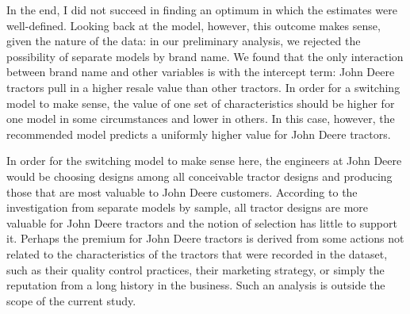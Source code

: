 \documentclass[11pt]{paper}
\begin{document}
In the end, I did not succeed in finding an optimum in which the estimates were well-defined. 
Looking back at the model, however, this outcome makes sense, 
given the nature of the data: in our preliminary analysis, 
we rejected the possibility of separate models by brand name. 
We found that the only interaction between brand name and other variables is with the intercept term:
John Deere tractors pull in a higher resale value than other tractors. 
In order for a switching model to make sense, the value of one set of characteristics should be higher for one model in some circumstances and lower in others. 
In this case, however, the recommended model predicts a uniformly higher value 
for John Deere tractors. 

In order for the switching model to make sense here, the engineers at John Deere would be choosing designs among all conceivable tractor designs
and producing those that are most valuable to John Deere customers. 
According to the investigation from separate models by sample, 
all tractor designs are more valuable for John Deere tractors and 
the notion of selection has little to support it. 
Perhaps the premium for John Deere tractors is derived from some
actions not related to the characteristics of the tractors that were recorded in the dataset, such as their quality control practices, their marketing strategy, 
or simply the reputation from a long history in the business. 
Such an analysis is outside the scope of the current study. 



\end{document}
